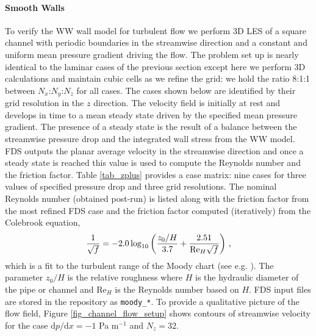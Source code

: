 \documentclass[11pt]{book}
\begin{document}
\paragraph{Smooth Walls}

To verify the WW wall model for turbulent flow we perform 3D LES of a square channel with periodic boundaries in the streamwise direction and a constant and uniform mean pressure gradient driving the flow.  The problem set up is nearly identical to the laminar cases of the previous section except here we perform 3D calculations and maintain cubic cells as we refine the grid: we hold the ratio 8:1:1 between $N_x$:$N_y$:$N_z$ for all cases.  The cases shown below are identified by their grid resolution in the $z$ direction.  The velocity field is initially at rest and develops in time to a mean steady state driven by the specified mean pressure gradient.  The presence of a steady state is the result of a balance between the streamwise pressure drop and the integrated wall stress from the WW model.  FDS outputs the planar average velocity in the streamwise direction and once a steady state is reached this value is used to compute the Reynolds number and the friction factor.  Table \ref{tab_zplus} provides a case matrix: nine cases for three values of specified pressure drop and three grid resolutions.  The nominal Reynolds number (obtained post-run) is listed along with the friction factor from the most refined FDS case and the friction factor computed (iteratively) from the Colebrook equation,
\begin{equation}
\label{eqn_colebrook}
\frac{1}{\sqrt{f}} = -2.0 \log_{\scriptsize 10} \left( \frac{z_0/H}{3.7} + \frac{2.51}{\mbox{Re}_H\sqrt{f}} \right) \,\mbox{,}
\end{equation}
which is a fit to the turbulent range of the Moody chart (see e.g. \cite{MYO}).  The parameter $z_0/H$ is the relative roughness where $H$ is the hydraulic diameter of the pipe or channel and Re$_H$ is the Reynolds number based on $H$.  FDS input files are stored in the repository \cite{FDS-SMV_repository} as {\tt moody\_*}. To provide a qualitative picture of the flow field, Figure \ref{fig_channel_flow_setup} shows contours of streamwise velocity for the case $\mbox{d}p/\mbox{d}x = -1$ Pa m$^{-1}$ and $N_z=32$.
\end{document}
